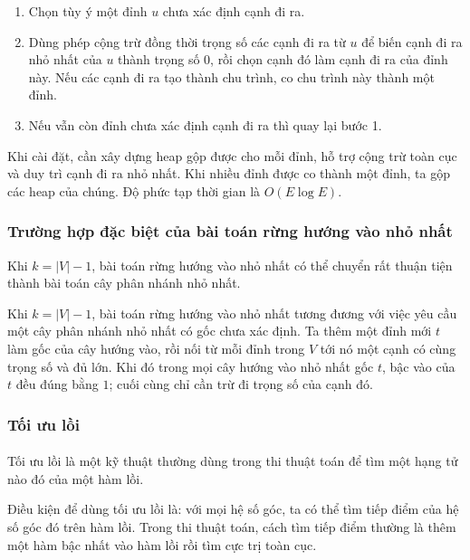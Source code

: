\documentclass[11pt]{article}
\begin{document}
\begin{enumerate}
  \item Chọn tùy ý một đỉnh \(u\) chưa xác định cạnh đi ra.
  \item Dùng phép cộng trừ đồng thời trọng số các cạnh đi ra từ \(u\) để biến
  cạnh đi ra nhỏ nhất của \(u\) thành trọng số \(0\), rồi chọn cạnh đó làm cạnh
  đi ra của đỉnh này. Nếu các cạnh đi ra tạo thành chu trình, co chu trình này
  thành một đỉnh.
  \item Nếu vẫn còn đỉnh chưa xác định cạnh đi ra thì quay lại bước 1.
\end{enumerate}

Khi cài đặt, cần xây dựng heap gộp được cho mỗi đỉnh, hỗ trợ cộng trừ toàn cục
và duy trì cạnh đi ra nhỏ nhất. Khi nhiều đỉnh được co thành một đỉnh, ta gộp
các heap của chúng. Độ phức tạp thời gian là \(O(E\log E)\).

\subsubsection{Trường hợp đặc biệt của bài toán rừng hướng vào nhỏ nhất}

Khi \(k=|V|-1\), bài toán rừng hướng vào nhỏ nhất có thể chuyển rất thuận tiện
thành bài toán cây phân nhánh nhỏ nhất.

Khi \(k=|V|-1\), bài toán rừng hướng vào nhỏ nhất tương đương với việc yêu cầu
một cây phân nhánh nhỏ nhất có gốc chưa xác định. Ta thêm một đỉnh mới \(t\)
làm gốc của cây hướng vào, rồi nối từ mỗi đỉnh trong \(V\) tới nó một cạnh có
cùng trọng số và đủ lớn. Khi đó trong mọi cây hướng vào nhỏ nhất gốc \(t\), bậc
vào của \(t\) đều đúng bằng \(1\); cuối cùng chỉ cần trừ đi trọng số của cạnh
đó.

\subsubsection{Tối ưu lồi}

\paragraph{}
Tối ưu lồi là một kỹ thuật thường dùng trong thi thuật toán để tìm một hạng tử
nào đó của một hàm lồi.

Điều kiện để dùng tối ưu lồi là: với mọi hệ số góc, ta có thể tìm tiếp điểm của
hệ số góc đó trên hàm lồi. Trong thi thuật toán, cách tìm tiếp điểm thường là
thêm một hàm bậc nhất vào hàm lồi rồi tìm cực trị toàn cục.
\end{document}
